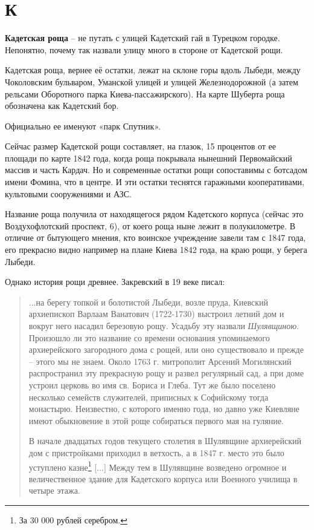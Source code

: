 \chapter*{К}

\textbf{Кадетская роща} – не путать с улицей Кадетский гай в Турецком городке. Непонятно, почему так назвали улицу много в стороне от Кадетской рощи.

Кадетская роща, вернее её остатки, лежат на склоне горы вдоль Лыбеди, между Чоколовским бульваром, Уманской улицей и улицей Железнодорожной (а затем рельсами Оборотного парка Киева-пассажирского). На карте Шуберта роща обозначена как Кадетский бор.

Официально ее именуют «парк Спутник».

Сейчас размер Кадетской рощи составляет, на глазок, 15 процентов от ее площади по карте 1842 года, когда роща покрывала нынешний Первомайский массив и часть Кардач. Но и современные остатки рощи сопоставимы с ботсадом имени Фомина, что в центре. И эти остатки теснятся гаражными кооперативами, культовыми сооружениями и АЗС.

Название роща получила от находящегося рядом Кадетского корпуса (сейчас это Воздухофлотский проспект, 6), от коего роща ныне лежит в полукилометре. В отличие от бытующего мнения, кто воинское учреждение завели там с 1847 года, его прекрасно видно например на плане Киева 1842 года, на краю рощи, у берега Лыбеди.

Однако история рощи древнее. Закревский в 19 веке писал:

\begin{quotation}
...на берегу топкой и болотистой Лыбеди, возле пруда, Киевский архиепископ Варлаам Ванатович (1722-1730) выстроил летний дом и вокруг него насадил березовую рощу. Усадьбу эту назвали \textit{Шулявщиною}. Произошло ли это название со времени основания упоминаемого архиерейского загородного дома с рощей, или оно существовало и прежде – этого мы не знаем. Около 1763 г. митрополит Арсений Могилянский распространил эту прекрасную рощу и развел регулярный сад, а при доме устроил церковь во имя св. Бориса и Глеба. Тут же было поселено несколько семейств служителей, приписных к Софийскому тогда монастырю. Неизвестно, с которого именно года, но давно уже Киевляне имеют обыкновение в этой роще собираться первого мая на гуляние.

В начале двадцатых годов текущего столетия в Шулявщине архиерейский дом с пристройками приходил в ветхость, а в 1847 г. место это было уступлено казне\footnote{За 30 000 рублей серебром.} [...] Между тем в Шулявщине возведено огромное и величественное здание для Кадетского корпуса или Военного училища в четыре этажа.
\end{quotation}

